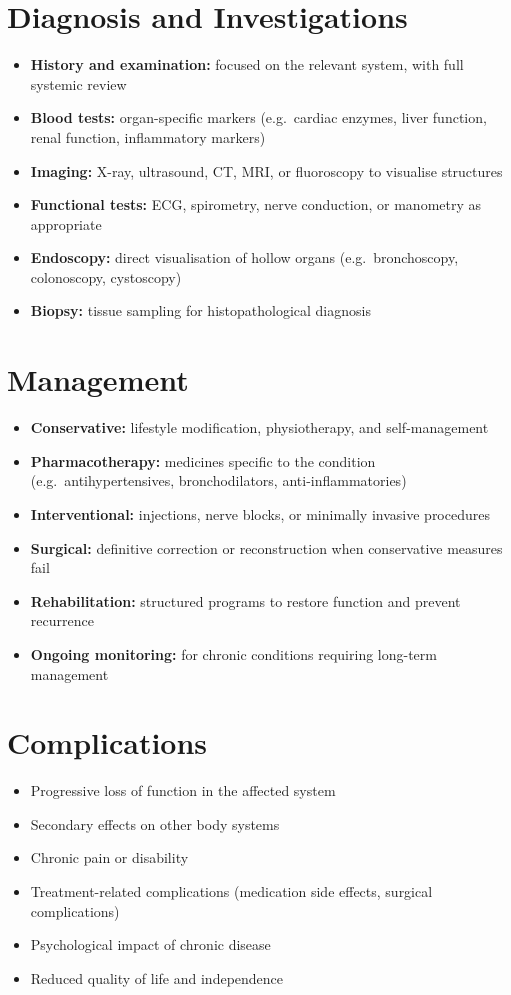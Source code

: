 \section*{Diagnosis and Investigations}
\begin{itemize}
    \item \textbf{History and examination:} focused on the relevant system, with full systemic review
    \item \textbf{Blood tests:} organ-specific markers (e.g.\ cardiac enzymes, liver function, renal function, inflammatory markers)
    \item \textbf{Imaging:} X-ray, ultrasound, CT, MRI, or fluoroscopy to visualise structures
    \item \textbf{Functional tests:} ECG, spirometry, nerve conduction, or manometry as appropriate
    \item \textbf{Endoscopy:} direct visualisation of hollow organs (e.g.\ bronchoscopy, colonoscopy, cystoscopy)
    \item \textbf{Biopsy:} tissue sampling for histopathological diagnosis
\end{itemize}

\section*{Management}
\begin{itemize}
    \item \textbf{Conservative:} lifestyle modification, physiotherapy, and self-management
    \item \textbf{Pharmacotherapy:} medicines specific to the condition (e.g.\ antihypertensives, bronchodilators, anti-inflammatories)
    \item \textbf{Interventional:} injections, nerve blocks, or minimally invasive procedures
    \item \textbf{Surgical:} definitive correction or reconstruction when conservative measures fail
    \item \textbf{Rehabilitation:} structured programs to restore function and prevent recurrence
    \item \textbf{Ongoing monitoring:} for chronic conditions requiring long-term management
\end{itemize}

\section*{Complications}
\begin{itemize}
    \item Progressive loss of function in the affected system
    \item Secondary effects on other body systems
    \item Chronic pain or disability
    \item Treatment-related complications (medication side effects, surgical complications)
    \item Psychological impact of chronic disease
    \item Reduced quality of life and independence
\end{itemize}

